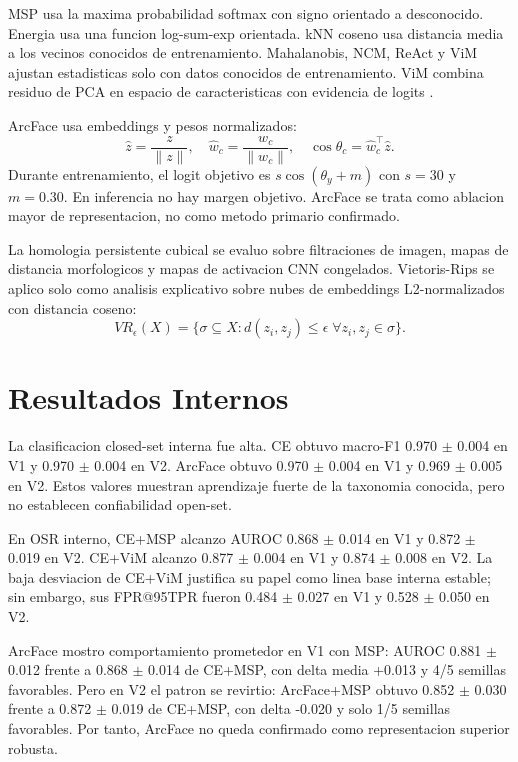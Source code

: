 \documentclass[11pt]{article}
\begin{document}
MSP usa la maxima probabilidad softmax con signo orientado a desconocido. Energia usa una funcion log-sum-exp orientada. kNN coseno usa distancia media a los vecinos conocidos de entrenamiento. Mahalanobis, NCM, ReAct y ViM ajustan estadisticas solo con datos conocidos de entrenamiento. ViM combina residuo de PCA en espacio de caracteristicas con evidencia de logits \cite{wang2022vim}.

ArcFace usa embeddings y pesos normalizados:
\[
\hat{z}=\frac{z}{\lVert z\rVert},\quad \hat{w}_c=\frac{w_c}{\lVert w_c\rVert},\quad \cos\theta_c=\hat{w}_c^\top \hat{z}.
\]
Durante entrenamiento, el logit objetivo es $s\cos(\theta_y+m)$ con $s=30$ y $m=0.30$. En inferencia no hay margen objetivo. ArcFace se trata como ablacion mayor de representacion, no como metodo primario confirmado.

La homologia persistente cubical se evaluo sobre filtraciones de imagen, mapas de distancia morfologicos y mapas de activacion CNN congelados. Vietoris-Rips se aplico solo como analisis explicativo sobre nubes de embeddings L2-normalizados con distancia coseno:
\[
VR_\epsilon(X)=\{\sigma\subseteq X: d(z_i,z_j)\leq \epsilon\;\forall z_i,z_j\in\sigma\}.
\]

\section{Resultados Internos}

La clasificacion closed-set interna fue alta. CE obtuvo macro-F1 0.970 $\pm$ 0.004 en V1 y 0.970 $\pm$ 0.004 en V2. ArcFace obtuvo 0.970 $\pm$ 0.004 en V1 y 0.969 $\pm$ 0.005 en V2. Estos valores muestran aprendizaje fuerte de la taxonomia conocida, pero no establecen confiabilidad open-set.

En OSR interno, CE+MSP alcanzo AUROC 0.868 $\pm$ 0.014 en V1 y 0.872 $\pm$ 0.019 en V2. CE+ViM alcanzo 0.877 $\pm$ 0.004 en V1 y 0.874 $\pm$ 0.008 en V2. La baja desviacion de CE+ViM justifica su papel como linea base interna estable; sin embargo, sus FPR@95TPR fueron 0.484 $\pm$ 0.027 en V1 y 0.528 $\pm$ 0.050 en V2.

ArcFace mostro comportamiento prometedor en V1 con MSP: AUROC 0.881 $\pm$ 0.012 frente a 0.868 $\pm$ 0.014 de CE+MSP, con delta media +0.013 y 4/5 semillas favorables. Pero en V2 el patron se revirtio: ArcFace+MSP obtuvo 0.852 $\pm$ 0.030 frente a 0.872 $\pm$ 0.019 de CE+MSP, con delta -0.020 y solo 1/5 semillas favorables. Por tanto, ArcFace no queda confirmado como representacion superior robusta.
\end{document}

